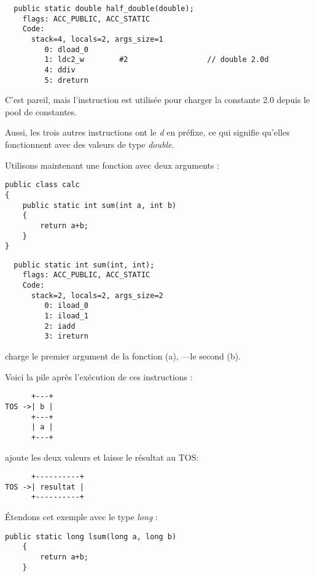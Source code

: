 \begin{lstlisting}
  public static double half_double(double);
    flags: ACC_PUBLIC, ACC_STATIC
    Code:
      stack=4, locals=2, args_size=1
         0: dload_0       
         1: ldc2_w        #2                  // double 2.0d
         4: ddiv          
         5: dreturn       
\end{lstlisting}

C'est pareil, mais l'instruction  est utilisée pour charger la constante
2.0 depuis le pool de constantes.

Aussi, les trois autres instructions ont le \emph{d} en préfixe,
ce qui signifie qu'elles fonctionnent avec des valeurs de type \emph{double}.


Utilisons maintenant une fonction avec deux arguments :

\begin{lstlisting}[style=customjava]
public class calc
{
	public static int sum(int a, int b)
	{
		return a+b;
	}
}
\end{lstlisting}

\begin{lstlisting}
  public static int sum(int, int);
    flags: ACC_PUBLIC, ACC_STATIC
    Code:
      stack=2, locals=2, args_size=2
         0: iload_0       
         1: iload_1       
         2: iadd          
         3: ireturn       
\end{lstlisting}

 charge le premier argument de la fonction (a), ---le second (b).

Voici la pile après l'exécution de ces instructions :

\begin{lstlisting}
      +---+
TOS ->| b |
      +---+
      | a |
      +---+
\end{lstlisting}

 ajoute les deux valeurs et laisse le résultat au \ac{TOS}:


\begin{lstlisting}
      +----------+
TOS ->| resultat |
      +----------+
\end{lstlisting}

Étendons cet exemple avec le type \emph{long} :


\begin{lstlisting}[style=customjava]
	public static long lsum(long a, long b)
	{
		return a+b;
	}
\end{lstlisting}

